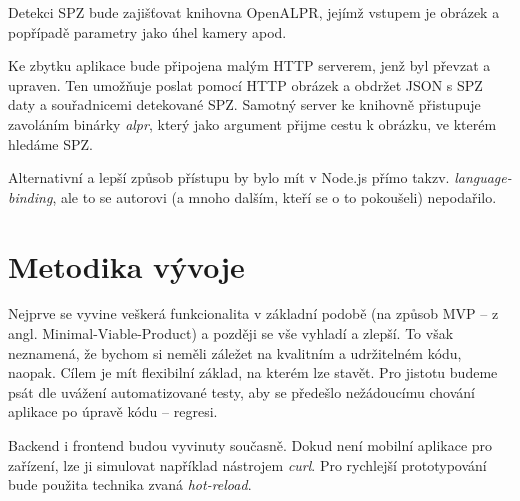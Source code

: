 \noindent
Detekci SPZ bude zajišťovat knihovna OpenALPR, jejímž vstupem je obrázek a popřípadě
parametry jako úhel kamery apod.
\citep[][]{OpenALPR}

Ke zbytku aplikace bude připojena malým HTTP serverem, jenž byl převzat a upraven.
Ten umožňuje poslat pomocí HTTP obrázek a obdržet JSON s SPZ daty a souřadnicemi detekované SPZ.
Samotný server ke knihovně přistupuje zavoláním binárky \textit{alpr}, který jako argument přijme cestu k
obrázku, ve kterém hledáme SPZ. \citep[][]{OpenALPR_Server}

Alternativní a lepší způsob přístupu by bylo mít v Node.js přímo takzv.
\textit{language-binding}, ale to se autorovi (a mnoho dalším, kteří se o to pokoušeli) nepodařilo.

\section{Metodika vývoje}

\noindent
Nejprve se vyvine veškerá funkcionalita v základní podobě
(na způsob MVP -- z angl. Minimal-Viable-Product) a později se vše vyhladí a zlepší. To však neznamená,
že bychom si neměli záležet na kvalitním a udržitelném kódu, naopak. Cílem je mít flexibilní základ,
na kterém lze stavět. Pro jistotu budeme psát dle uvážení automatizované testy, aby se předešlo
nežádoucímu chování aplikace po úpravě kódu -- regresi.

Backend i frontend budou vyvinuty současně. Dokud není mobilní aplikace pro zařízení, lze ji simulovat
například nástrojem \textit{curl}. Pro rychlejší prototypování bude použita technika zvaná
\textit{hot-reload}.
